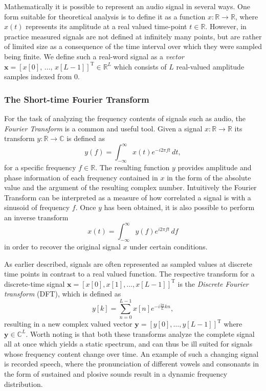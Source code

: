 \documentclass{article}
\begin{document}
Mathematically it is possible to represent an audio signal in several ways. One form suitable for theoretical analysis is to define it as a function $x: \mathbb{R} \rightarrow \mathbb{R}$, where $x(t)$ represents its amplitude at a real valued time-point $t \in \mathbb{R}$. However, in practice measured signals are not defined at infinitely many points, but are rather of limited size as a consequence of the time interval over which they were sampled being finite. We define such a real-word signal as a \textit{vector} $\bm{x} = [x[0], \, \dots, \, x[L-1]]^{\text{T}} \in \mathbb{R}^{L}$ which consists of $L$ real-valued amplitude samples indexed from $0$.

\subsubsection{The Short-time Fourier Transform} \label{sec:stft}

For the task of analyzing the frequency contents of signals such as audio, the \textit{Fourier Transform} is a common and useful tool. Given a signal $x: \mathbb{R} \to \mathbb{R}$ its transform $y: \mathbb{R} \to \mathbb{C}$ is defined as
\begin{equation}
\label{eq:fouriert}
    y(f) = \int_{-\infty}^{\infty} x(t) e^{-i 2\pi f t} \, dt,
\end{equation}
for a specific frequency $f\in\mathbb{R}$. The resulting function $y$ provides amplitude and phase information of each frequency contained in $x$ in the form of the absolute value and the argument of the resulting complex number. Intuitively the Fourier Transform can be interpreted as a measure of how correlated a signal is with a sinusoid of frequency $f$. Once $y$ has been obtained, it is also possible to perform an inverse transform
\begin{equation}
    x(t) = \int_{-\infty}^{\infty} y(f) e^{i 2\pi f t} \, df
\end{equation}
in order to recover the original signal $x$ under certain conditions.

As earlier described, signals are often represented as sampled values at discrete time points in contrast to a real valued function. The respective transform for a discrete-time signal $\bm{x}=\left[ x[0], x[1], \dots , x[L-1] \right]^{\text{T}}$ is the \textit{Discrete Fourier transform} (DFT), which is defined as
\begin{equation}
    y[k] = \sum_{n=0}^{L-1} x[n] e^{-i \frac{2\pi}{L}k n},
\end{equation}
resulting in a new complex valued vector $\bm{y} = [y[0],\dots, y[L-1]]^{\text{T}}$ where $\bm{y}\in \mathbb{C}^{L}$. Worth noting is that both these transforms analyze the complete signal all at once which yields a static spectrum, and can thus be ill suited for signals whose frequency content change over time. An example of such a changing signal is recorded speech, where the pronunciation of different vowels and consonants in the form of sustained and plosive sounds result in a dynamic frequency distribution.
\end{document}
